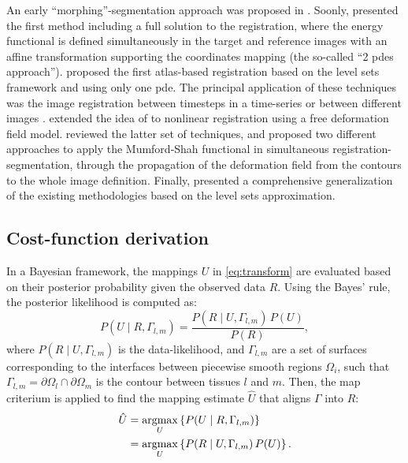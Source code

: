 An early ``morphing''-segmentation approach was proposed in \citep{bertalmio_morphing_2000}.
Soonly, \cite{yezzi_variational_2001} presented the first method including a full solution to
  the registration, where the energy functional is defined simultaneously in the target
  and reference images with an affine transformation supporting the coordinates mapping
  (the so-called ``2 \glspl*{pde} approach'').
\cite{vemuri_joint_2003} proposed the first atlas-based registration based on the level sets
  framework and using only one \gls*{pde}.
The principal application of these techniques was the image registration between timesteps in
  a time-series or between different images \citep{paragios_level_2003}.
\cite{unal_coupled_2005} extended the idea of \citep{yezzi_variational_2001} to nonlinear
  registration using a free deformation field model.
\cite{droske_mumfordshah_2009} reviewed the latter set of techniques, and proposed two different
  approaches to apply the Mumford-Shah functional \citep{mumford_optimal_1989} in simultaneous
  registration-segmentation, through the propagation of the deformation field from
  the contours to the whole image definition.
Finally, \cite{gorthi_active_2011} presented a comprehensive generalization of the
  existing methodologies based on the level sets approximation.




\subsection*{Cost-function derivation}
\label{sec:methods_map}

In a Bayesian framework, the mappings $U$ in \autoref{eq:transform} are
  evaluated based on their posterior probability given the observed data
  $R$.
Using the Bayes' rule, the posterior likelihood is computed as:
  \begin{equation}
  P(U \mid R,\Gamma_{l,m}) = \frac{P(R \mid U,\Gamma_{l,m})\, P(U)}{P(R)},
  \label{eq:bayes_rule}
  \end{equation}
  where $P(R \mid U,\Gamma_{l,m})$ is the data-likelihood, and
  $\Gamma_{l,m}$ are a set of surfaces corresponding to the interfaces
  between piecewise smooth regions $\Omega_i$, such that
  $\Gamma_{l,m} = \partial \Omega_l \cap \partial \Omega_m$ is the
  contour between tissues $l$ and $m$.
Then, the \gls*{map} criterium is applied to find the mapping estimate $\hat{U}$
  that aligns $\Gamma$ into $R$:
  \begin{align}
  \hat{U} &= \underset{U}{\operatorname{argmax}} \left\{ P(U \mid R,\Gamma_{l,m}) \right\} \notag\\
   &= \underset{U}{\operatorname{argmax}} \left\{ P(R \mid U,\Gamma_{l,m})\, P(U) \right\}.
  \label{eq:map_u}
  \end{align}

